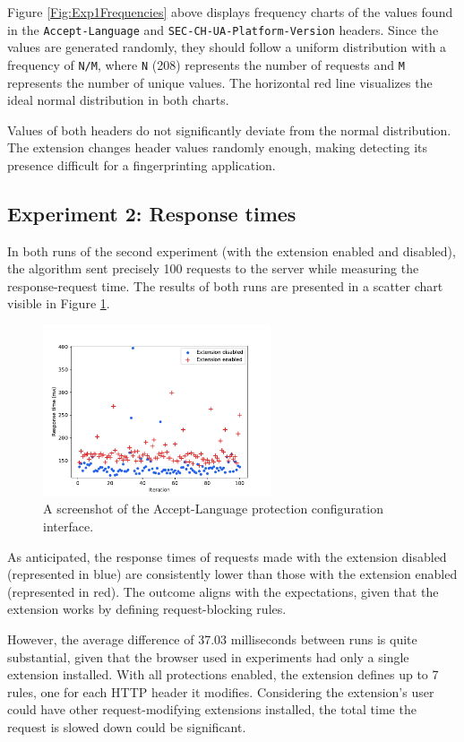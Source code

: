 \medbreak

Figure \ref{Fig:Exp1Frequencies} above displays frequency charts of the values found in the \texttt{Accept-Language} and \texttt{SEC-CH-UA-Platform-Version} headers. Since the values are generated randomly, they should follow a uniform distribution with a frequency of \verb|N/M|, where \verb|N| (208) represents the number of requests and \verb|M| represents the number of unique values. The horizontal red line visualizes the ideal normal distribution in both charts.

Values of both headers do not significantly deviate from the normal distribution. The extension changes header values randomly enough, making detecting its presence difficult for a fingerprinting application.

\subsection{Experiment 2: Response times}

In both runs of the second experiment (with the extension enabled and disabled), the algorithm sent precisely 100 requests to the server while measuring the response-request time. The results of both runs are presented in a scatter chart visible in Figure \ref{Fig:Exp2Chart}.

\begin{figure}[H]
    \centering
    \includegraphics[width=0.6\textwidth]{obrazky-figures/response_times_comparison}
    \caption{A screenshot of the Accept-Language protection configuration interface.}
    \label{Fig:Exp2Chart}
\end{figure}

As anticipated, the response times of requests made with the extension disabled (represented in blue) are consistently lower than those with the extension enabled (represented in red). The outcome aligns with the expectations, given that the extension works by defining request-blocking rules.

However, the average difference of 37.03 milliseconds between runs is quite substantial, given that the browser used in experiments had only a single extension installed. With all protections enabled, the extension defines up to 7 rules, one for each HTTP header it modifies. Considering the extension's user could have other request-modifying extensions installed, the total time the request is slowed down could be significant.

% 